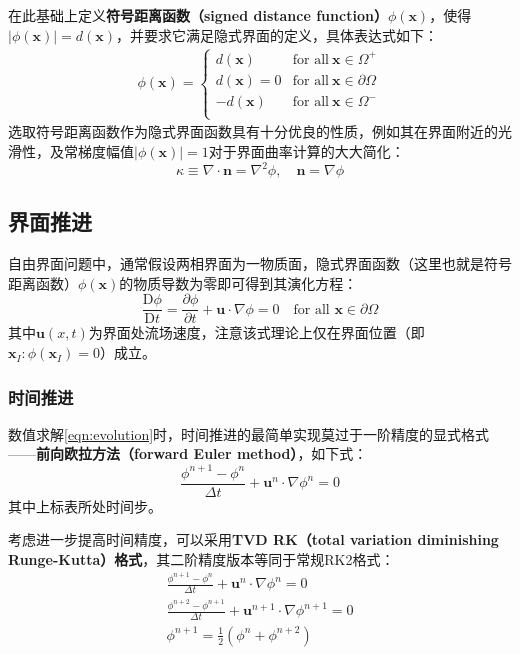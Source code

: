 \documentclass[11pt]{article}
\begin{document}
在此基础上定义\textbf{符号距离函数（signed distance function）}$\phi(\bm{x})$，使得$|\phi(\bm{x})|=d(\bm{x})$，并要求它满足隐式界面的定义，具体表达式如下：
\begin{eqnarray}
    \phi(\bm{x})=\left\{\begin{array}{rl}
        d(\bm{x})   & \text{for all}\ \bm{x}\in\Omega^+       \\
        d(\bm{x})=0 & \text{for all}\ \bm{x}\in\partial\Omega \\
        -d(\bm{x})  & \text{for all}\ \bm{x}\in\Omega^-       \\
    \end{array}\right.
    \label{eqn:sdf}
\end{eqnarray}
选取符号距离函数作为隐式界面函数具有十分优良的性质，例如其在界面附近的光滑性，及常梯度幅值$\left|\phi(\bm{x})\right|=1$对于界面曲率计算的大大简化：
\begin{equation}
    \kappa\equiv\nabla\cdot\bm{n}=\nabla^2\phi,\quad \bm{n}=\nabla\phi
\end{equation}

\subsection{界面推进}
自由界面问题中，通常假设两相界面为一物质面，隐式界面函数（这里也就是符号距离函数）$\phi(\bm{x})$的物质导数为零即可得到其演化方程：
\begin{equation}
    \frac{\mathrm{D}\phi}{\mathrm{D}t}=\frac{\partial\phi}{\partial t}+\bm{u}\cdot\nabla\phi=0\quad\text{for all }\bm{x}\in\partial\Omega
    \label{eqn:evolution}
\end{equation}
其中$\bm{u}(x,t)$为界面处流场速度，注意该式理论上仅在界面位置（即$\bm{x}_I:\phi(\bm{x}_I)=0$）成立。

\subsubsection{时间推进}
数值求解\autoref{eqn:evolution}时，时间推进的最简单实现莫过于一阶精度的显式格式——\textbf{前向欧拉方法（forward Euler method）}，如下式：
\begin{equation}
    \frac{\phi^{n+1}-\phi^n}{\Delta t}+\bm{u}^n\cdot\nabla\phi^n=0
\end{equation}
其中上标表所处时间步。

考虑进一步提高时间精度，可以采用\textbf{TVD RK（total variation diminishing Runge-Kutta）格式}，其二阶精度版本等同于常规RK2格式：
\begin{eqnarray}
    \frac{\phi^{n+1}-\phi^n}{\Delta t}+\bm{u}^n\cdot\nabla\phi^n=0 \\
    \frac{\phi^{n+2}-\phi^{n+1}}{\Delta t}+\bm{u}^{n+1}\cdot\nabla\phi^{n+1}=0 \\
    \phi^{n+1}=\frac{1}{2}\left(\phi^n+\phi^{n+2}\right)
\end{eqnarray}
\end{document}
